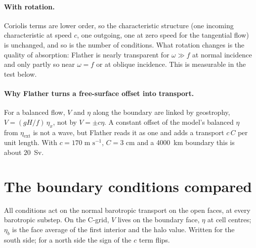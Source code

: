 \documentclass[11pt]{article}
\newcommand{\ext}{\mathrm{ext}}
\begin{document}
\paragraph{With rotation.} Coriolis terms are lower order, so the characteristic structure (one incoming
characteristic at speed $c$, one outgoing, one at zero speed for the tangential flow) is unchanged, and so is the
number of conditions. What rotation changes is the quality of absorption: Flather is nearly transparent for
$\omega\gg f$ at normal incidence and only partly so near $\omega=f$ or at oblique incidence. This is measurable in
the test below.

\paragraph{Why Flather turns a free-surface offset into transport.} For a balanced flow, $V$ and $\eta$ along the
boundary are linked by geostrophy, $V=(gH/f)\,\eta_x$, not by $V=\pm c\eta$. A constant offset of the model's
balanced $\eta$ from $\eta_\ext$ is not a wave, but Flather reads it as one and adds a transport $c\,C$ per unit
length. With $c=170\text{ m s}^{-1}$, $C=3\text{ cm}$ and a 4000~km boundary this is about $20$~Sv.

\section{The boundary conditions compared}

All conditions act on the normal barotropic transport on the open faces, at every barotropic substep. On the
C-grid, $V$ lives on the boundary face, $\eta$ at cell centres; $\eta_b$ is the face average of the first
interior and the halo value. Written for the south side; for a north side the sign of the $c$ term flips.
\end{document}
